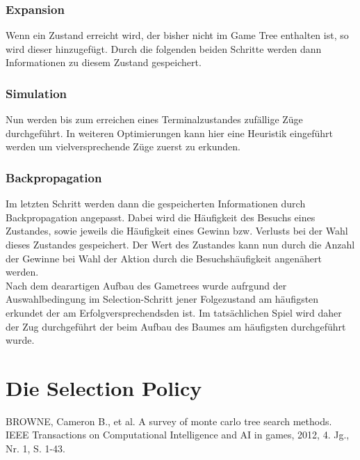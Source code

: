 \subsubsection{Expansion}
Wenn ein Zustand erreicht wird, der bisher nicht im Game Tree enthalten ist, so wird dieser hinzugefügt. Durch die folgenden beiden Schritte werden dann Informationen zu diesem Zustand gespeichert.
\subsubsection{Simulation}
Nun werden bis zum erreichen eines Terminalzustandes zufällige Züge durchgeführt. In weiteren Optimierungen kann hier eine Heuristik eingeführt werden um vielversprechende Züge zuerst zu erkunden.
\subsubsection{Backpropagation}
Im letzten Schritt werden dann die gespeicherten Informationen durch Backpropagation angepasst. Dabei wird die Häufigkeit des Besuchs eines Zustandes, sowie jeweils die Häufigkeit eines Gewinn bzw. Verlusts bei der Wahl dieses Zustandes gespeichert. Der Wert des Zustandes kann nun durch die Anzahl der Gewinne bei Wahl der Aktion durch die Besuchshäufigkeit angenähert werden.\\
Nach dem dearartigen Aufbau des Gametrees wurde aufrgund der Auswahlbedingung im Selection-Schritt jener Folgezustand am häufigsten erkundet der am Erfolgversprechendsden ist. Im tatsächlichen Spiel wird daher der Zug durchgeführt der beim Aufbau des Baumes am häufigsten durchgeführt wurde.
\section{Die Selection Policy}
{BROWNE, Cameron B., et al. A survey of monte carlo tree search methods. IEEE Transactions on Computational Intelligence and AI in games, 2012, 4. Jg., Nr. 1, S. 1-43.}\\
